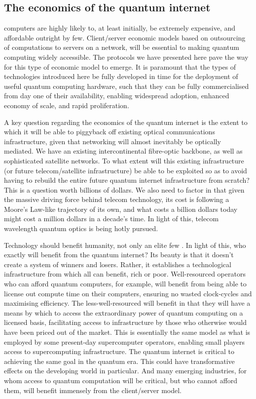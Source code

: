 \subsection{The economics of the quantum internet} \label{sec:economics} 

 computers are highly likely to, at least initially, be extremely expensive, and affordable outright by few. Client/server economic models based on outsourcing of computations to servers on a network, will be essential to making quantum computing widely accessible. The protocols we have presented here pave the way for this type of economic model to emerge. It is paramount that the types of technologies introduced here be fully developed in time for the deployment of useful quantum computing hardware, such that they can be fully commercialised from day one of their availability, enabling widespread adoption, enhanced economy of scale, and rapid proliferation.

A key question regarding the economics of the quantum internet is the extent to which it will be able to piggyback off existing optical communications infrastructure, given that networking will almost inevitably be optically mediated. We have an existing intercontinental fibre-optic backbone, as well as sophisticated satellite networks. To what extent will this existing infrastructure (or future telecom/satellite infrastructure) be able to be exploited so as to avoid having to rebuild the entire future quantum internet infrastructure from scratch? This is a question worth billions of dollars. We also need to factor in that given the massive driving force behind telecom technology, its cost is following a Moore's Law-like trajectory of its own, and what costs a billion dollars today might cost a million dollars in a decade's time. In light of this, telecom wavelength quantum optics is being hotly pursued.

Technology should benefit humanity, not only an elite few . In light of this, who exactly will benefit from the quantum internet? Its beauty is that it doesn't create a system of winners and losers. Rather, it establishes a technological infrastructure from which all can benefit, rich or poor. Well-resourced operators who can afford quantum computers, for example, will benefit from being able to license out compute time on their computers, ensuring no wasted clock-cycles and maximising efficiency. The less-well-resourced will benefit in that they will have a means by which to access the extraordinary power of quantum computing on a licensed basis, facilitating access to infrastructure by those who otherwise would have been priced out of the market. This is essentially the same model as what is employed by some present-day supercomputer operators, enabling small players access to supercomputing infrastructure. The quantum internet is critical to achieving the same goal in the quantum era. This could have transformative effects on the developing world in particular. And many emerging industries, for whom access to quantum computation will be critical, but who cannot afford them, will benefit immensely from the client/server model.

